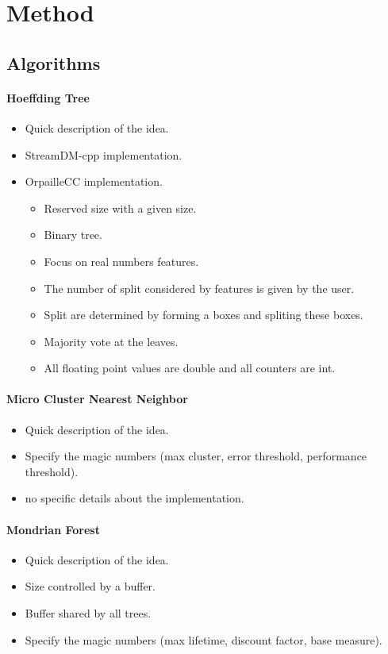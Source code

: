 \section{Method}
\subsection{Algorithms}
\paragraph{Hoeffding Tree~\cite{VFDT}}
\begin{itemize}
	\item Quick description of the idea.
	\item StreamDM-cpp implementation.
	\item OrpailleCC implementation.
	\begin{itemize}
		\item Reserved size with a given size.
		\item Binary tree.
		\item Focus on real numbers features.
		\item The number of split considered by features is given by the user.
		\item Split are determined by forming a boxes and spliting these boxes.
		\item Majority vote at the leaves.
		\item All floating point values are double and all counters are int.
	\end{itemize}
\end{itemize}
\paragraph{Micro Cluster Nearest Neighbor~\cite{mc-nn}}
\begin{itemize}
	\item Quick description of the idea.
	\item Specify the magic numbers (max cluster, error threshold, performance threshold).
	\item no specific details about the implementation.
\end{itemize}
\paragraph{Mondrian Forest~\cite{mondrian2014}}
\begin{itemize}
	\item Quick description of the idea.
	\item Size controlled by a buffer.
	\item Buffer shared by all trees.
	\item Specify the magic numbers (max lifetime, discount factor, base measure).
\end{itemize}
